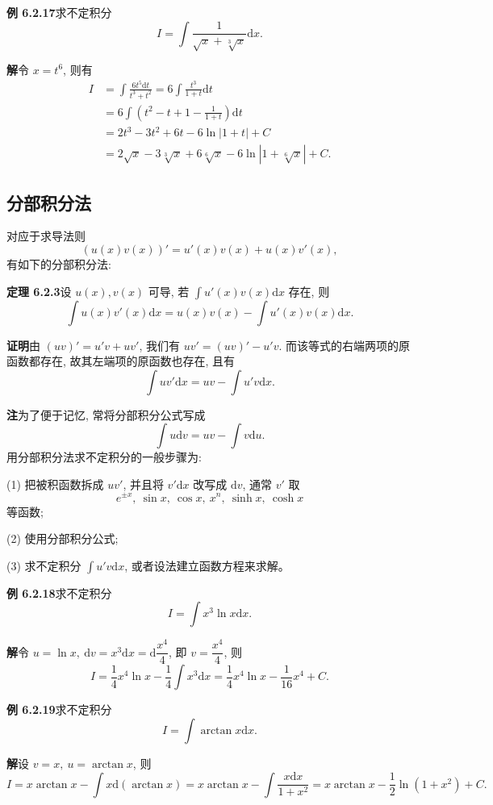 \documentclass[UTF8, 12pt, fontset=fandol, oneside]{ctexart}
\begin{document}
\noindent\textbf{例 6.2.17}\quad 求不定积分
\[
  I=\int\frac1{\sqrt x+\sqrt[3]x}\mathrm dx.
\]

\noindent\textbf{解}\quad 令 $x=t^6$, 则有
\[
\begin{aligned}
  I
  &=
  \int\frac{6t^5\mathrm dt}{t^3+t^2}
  =
  6\int\frac{t^3}{1+t}\mathrm dt\\
  &=
  6\int\left(t^2-t+1-\frac1{1+t}\right)\mathrm dt\\
  &=
  2t^3-3t^2+6t-6\ln|1+t|+C\\
  &=
  2\sqrt x-3\sqrt[3]x+6\sqrt[6]x-6\ln|1+\sqrt[6]x|+C.
\end{aligned}
\]

\subsection{分部积分法}

对应于求导法则
\[
  (u(x)v(x))'=u'(x)v(x)+u(x)v'(x),
\]
有如下的分部积分法:

\noindent\textbf{定理 6.2.3}\quad 设 $u(x),v(x)$ 可导, 若 $\int u'(x)v(x)\mathrm dx$ 存在, 则
\[
  \int u(x)v'(x)\mathrm dx
  =
  u(x)v(x)-\int u'(x)v(x)\mathrm dx.
\]

\noindent\textbf{证明}\quad 由 $(uv)'=u'v+uv'$, 我们有 $uv'=(uv)'-u'v$. 而该等式的右端两项的原函数都存在, 故其左端项的原函数也存在, 且有
\[
  \int uv'\mathrm dx=uv-\int u'v\mathrm dx.
\]

\noindent\textbf{注}\quad 为了便于记忆, 常将分部积分公式写成
\[
  \int u\mathrm dv=uv-\int v\mathrm du.
\]
用分部积分法求不定积分的一般步骤为:

(1) 把被积函数拆成 $uv'$, 并且将 $v'\mathrm dx$ 改写成 $\mathrm dv$, 通常 $v'$ 取
\[
  e^{\pm x},\ \sin x,\ \cos x,\ x^n,\ \sinh x,\ \cosh x
\]
等函数;

(2) 使用分部积分公式;

(3) 求不定积分 $\int u'v\mathrm dx$, 或者设法建立函数方程来求解。

\noindent\textbf{例 6.2.18}\quad 求不定积分
\[
  I=\int x^3\ln x\mathrm dx.
\]

\noindent\textbf{解}\quad 令 $u=\ln x,\ \mathrm dv=x^3\mathrm dx=\mathrm d\dfrac{x^4}4$, 即 $v=\dfrac{x^4}4$, 则
\[
  I=\frac14x^4\ln x-\frac14\int x^3\mathrm dx
  =
  \frac14x^4\ln x-\frac1{16}x^4+C.
\]

\noindent\textbf{例 6.2.19}\quad 求不定积分
\[
  I=\int\arctan x\mathrm dx.
\]

\noindent\textbf{解}\quad 设 $v=x,\ u=\arctan x$, 则
\[
  I
  =
  x\arctan x-\int x\mathrm d(\arctan x)
  =
  x\arctan x-\int\frac{x\mathrm dx}{1+x^2}
  =
  x\arctan x-\frac12\ln(1+x^2)+C.
\]
\end{document}
